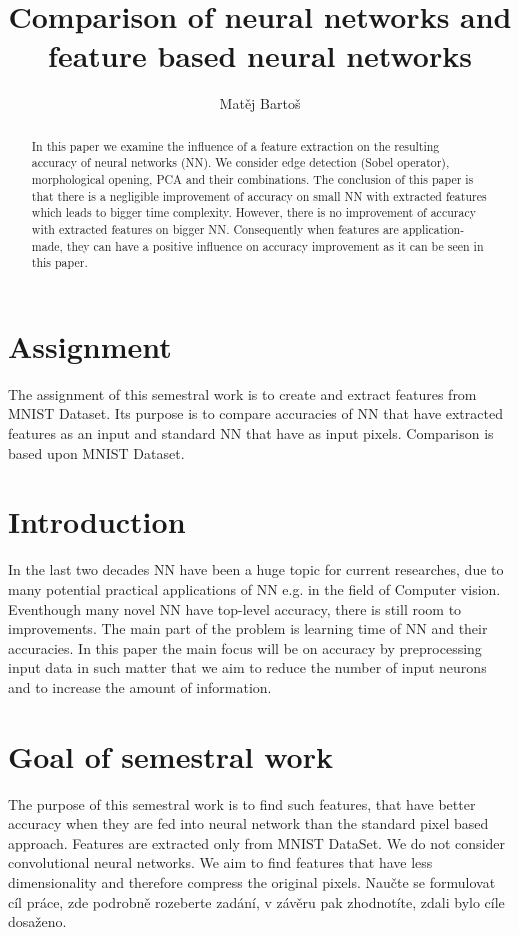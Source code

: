 \documentclass[journal]{IEEEtran}
\begin{document}
\title{Comparison of neural networks and feature based neural networks}
\author{Matěj Bartoš}

\maketitle

\begin{abstract}
In this paper we examine the influence of a feature extraction on the resulting accuracy of neural networks (NN).
We consider edge detection (Sobel operator), morphological opening, PCA and their combinations.
The conclusion of this paper is that there is a negligible improvement of accuracy on small NN with extracted features which leads to bigger time complexity. However, there is no improvement of accuracy with extracted features on bigger NN. Consequently when features are application-made, they can have a positive influence on accuracy improvement as it can be seen in this paper.
\end{abstract}

\IEEEpeerreviewmaketitle

\section{Assignment}
The assignment of this semestral work is to create and extract features from MNIST\cite{mnistlecun} Dataset. Its purpose is to compare accuracies of NN that have extracted features as an input and standard NN that have as input pixels. Comparison is based upon MNIST Dataset.

\section{Introduction}
In the last two decades NN have been a huge topic for current researches, due to many potential practical applications of NN e.g. in the field of Computer vision. Eventhough many novel NN have top-level accuracy, there is still room to improvements. 
The main part of the problem is learning time of NN and their accuracies. In this paper the main focus will be on accuracy by preprocessing input data in such matter that we aim to reduce the number of input neurons and to increase the amount of information.

\section{Goal of semestral work}
The purpose of this semestral work is to find such features, that have better accuracy when they are fed into neural network than the standard pixel based approach. Features are extracted only from MNIST DataSet. We do not consider convolutional neural networks. We aim to find features that have less dimensionality and therefore compress the original pixels.
Naučte se formulovat cíl práce, zde podrobně rozeberte zadání, v závěru pak zhodnotíte, zdali
bylo cíle dosaženo.
\end{document}
